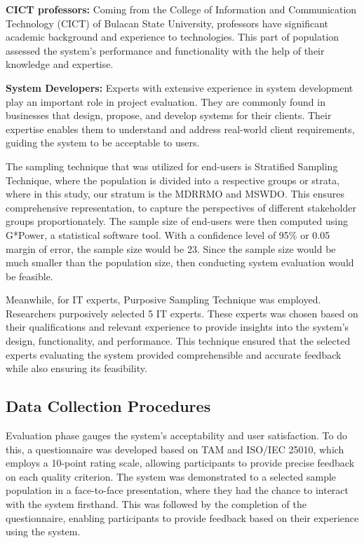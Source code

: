 	\textbf{CICT professors:} Coming from the College of Information and Communication Technology (CICT) of Bulacan State University, professors have significant academic background and experience to technologies. This part of population assessed the system's performance and functionality with the help of their knowledge and expertise.
	
	\textbf{System Developers:} Experts with extensive experience in system development play an important role in project evaluation. They are commonly found in businesses that design, propose, and develop systems for their clients. Their expertise enables them to understand and address real-world client requirements, guiding the system to be acceptable to users.
	
	The sampling technique that was utilized for end-users is Stratified Sampling Technique, where the population is divided into a respective groups or strata, where in this study, our stratum is the MDRRMO and MSWDO. This ensures comprehensive representation, to capture the perspectives of different stakeholder groups proportionately. The sample size of end-users were then computed using G*Power, a statistical software tool. With a confidence level of 95\% or 0.05 margin of error, the sample size would be 23. Since the sample size would be much smaller than the population size, then conducting system evaluation would be feasible.
	
	Meanwhile, for IT experts, Purposive Sampling Technique was employed. Researchers purposively selected 5 IT experts. These experts was chosen based on their qualifications and relevant experience to provide insights into the system's design, functionality, and performance. This technique ensured that the selected experts evaluating the system provided comprehensible and accurate feedback while also ensuring its feasibility.
	
\subsection{Data Collection Procedures}
	Evaluation phase gauges the system’s acceptability and user satisfaction. To do this, a questionnaire was developed based on TAM and ISO/IEC 25010, which employs a 10-point rating scale, allowing participants to provide precise feedback on each quality criterion. The system was demonstrated to a selected sample population in a face-to-face presentation, where they had the chance to interact with the system firsthand. This was followed by the completion of the questionnaire, enabling participants to provide feedback based on their experience using the system.
	

